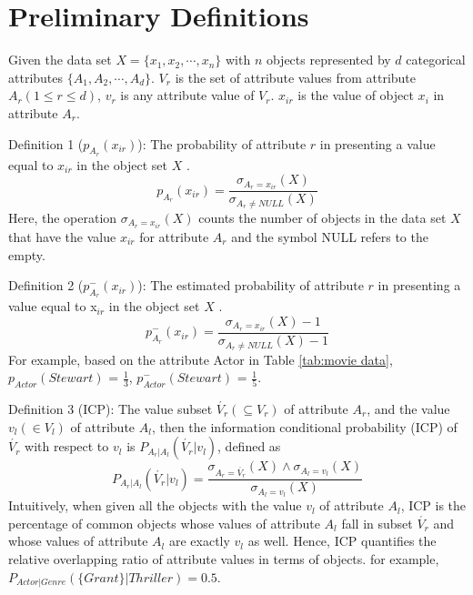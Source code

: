 \documentclass[review]{elsarticle}
\begin{document}
\section{Preliminary Definitions}
Given the data set ${X} = \{x_1,x_2,\cdots,x_n\}$ with $n$ objects represented by $d$ categorical attributes $\{A_1,A_2,\cdots,A_d\}$. $V_r$ is the set of attribute values from attribute $A_r (1 \leq r \leq d)$, $v_r$ is any attribute value of $V_r$. $x_{ir}$ is the value of object $x_i$ in attribute $A_r$.

Definition 1 ($p_{A_r}(x_{ir})$): The probability of attribute $r$ in presenting a value equal to $x_{ir}$ in the object set $X$ \cite{TiagoC2015SimilarityMeasure}.
\begin{equation}
p_{A_r}(x_{ir}) = \frac{\sigma_{A_r = x_{ir}}(X)}{\sigma_{A_r \neq NULL}(X)}
\label{equ1}
\end{equation}
Here, the operation $\sigma_{A_r = x_{ir}}(X)$ counts the number of objects in the data set $X$ that have the value $x_{ir}$ for attribute $A_{r}$ and the symbol NULL refers to the empty.

Definition 2 ($p_{A_r}^-(x_{ir})$): The estimated probability of attribute $r$ in presenting a value equal to x$_{ir}$ in the object set $X$ \cite{TiagoC2015SimilarityMeasure}.
\begin{equation}
p_{A_r}^-(x_{ir}) = \frac{\sigma_{A_r = x_{ir}}(X) - 1}{\sigma_{A_r \neq NULL}(X) - 1}
\label{equ2}
\end{equation}
For example, based on the attribute Actor in Table \ref{tab:movie data}, $p_{Actor}(Stewart)$ = $\frac{1}{3}$,  $p_{Actor}^-(Stewart)$ = $\frac{1}{5}$.

Definition 3 (ICP): The value subset $\acute{V_r} (\subseteq V_r)$ of attribute $A_r$, and the value $v_l (\in V_l)$ of attribute $A_l$, then the information conditional probability (ICP) of $\acute{V_r}$ with respect to $v_l$ is $P_{{A_r}|{A_l}}(\acute{V_r} | v_l)$, defined as
\begin{equation}
P_{{A_r}|{A_l}}(\acute{V_r} | v_l) = \frac{\sigma_{A_r = \acute{V_r}}(X) \wedge \sigma_{A_l = v_l}(X)}{\sigma_{A_l = v_l}(X)}
\label{equ3}
\end{equation}
Intuitively, when given all the objects with the value $v_l$ of attribute $A_l$, ICP is the percentage of common objects whose values of attribute $A_l$ fall in subset $\acute{V_r}$ and whose values of attribute $A_l$ are exactly $v_l$ as well. Hence, ICP quantifies the relative overlapping ratio of attribute values in terms of objects. for example, $P_{Actor|Genre}(\{Grant\} | Thriller) = 0.5$.
\end{document}
